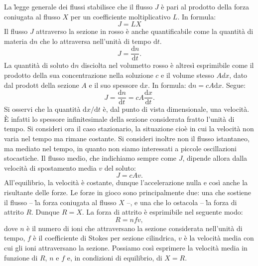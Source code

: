 La \h{legge generale dei flussi} stabilisce che il flusso $J$ è pari al prodotto della forza coniugata al flusso $X$ per un coefficiente moltiplicativo $L$. In formula:
\begin{equation}
    \label{eq:lgf}
     J = L X
\end{equation}
Il flusso $J$ attraverso la sezione in rosso è anche quantificabile come la quantità di materia $\mathrm{d}n$ che lo attraversa nell'unità di tempo $\mathrm{d}t$.
\begin{equation*}
    J = \frac{\mathrm{d}n}{\mathrm{d}t}.
\end{equation*}
La quantità di soluto $\mathrm{d}n$ disciolta nel volumetto rosso è altresì esprimibile come il prodotto della sua concentrazione nella soluzione $c$ e il volume stesso $A dx$, dato dal prodott della sezione $A$ e il suo spessore $\mathrm{d}x$. In formula: $\mathrm{d}n = c A \mathrm{d}x$. Segue:
\begin{equation*}
    J = \frac{\mathrm{d}n}{\mathrm{d}t} = cA\frac{\mathrm{d}x}{\mathrm{d}t}.
\end{equation*}
Si osservi che la quantità $\mathrm{d}x/\mathrm{d}t$ è, dal punto di vista dimensionale, una velocità. È infatti lo spessore infinitesimale della sezione considerata fratto l'unità di tempo. Si consideri ora il caso stazionario, la situazione cioè in cui la velocità non varia nel tempo ma rimane costante. Si consideri inoltre non il flusso istantaneo, ma mediato nel tempo, in quanto non siamo interessati a piccole oscillazioni stocastiche. Il flusso medio, che indichiamo sempre come $J$, dipende allora dalla velocità di spostamento media $v$ del soluto:
\begin{equation}
    \label{eq:J}
    J = cAv.
\end{equation}
All'equilibrio, la velocità è costante, dunque l'accelerazione nulla e così anche la risultante delle forze. Le forze in gioco sono principalmente due: una che sostiene il flusso -- \h{la forza coniugata al flusso $X$} --, e una che lo ostacola -- \h{la forza di attrito $R$}. Dunque $R = X$. La forza di attrito è esprimibile nel seguente modo:
\begin{equation*}
    R = n f v,
\end{equation*}
dove $n$ è il numero di ioni che attraversano la sezione considerata nell'unità di tempo, $f$ è il coefficiente di Stokes per sezione cilindrica, $v$ è la velocità media con cui gli ioni attraversano la sezione. Possiamo così esprimere la velocità media in funzione di $R$, $n$ e $f$ e, in condizioni di equilibrio, di $X = R$.

